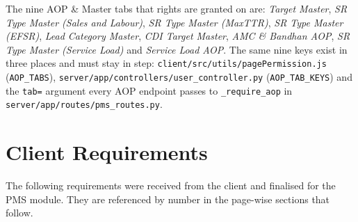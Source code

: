 \documentclass[11pt,a4paper]{article}
\newcommand{\file}[1]{\texttt{\small #1}}
\begin{document}
The nine AOP \& Master tabs that rights are granted on are: \textit{Target Master},
\textit{SR Type Master (Sales and Labour)}, \textit{SR Type Master (MaxTTR)},
\textit{SR Type Master (EFSR)}, \textit{Lead Category Master}, \textit{CDI Target
Master}, \textit{AMC \& Bandhan AOP}, \textit{SR Type Master (Service Load)} and
\textit{Service Load AOP}. The same nine keys exist in three places and must stay in
step: \file{client/src/utils/pagePermission.js} (\texttt{AOP\_TABS}),
\file{server/app/controllers/user\_controller.py} (\texttt{AOP\_TAB\_KEYS}) and the
\texttt{tab=} argument every AOP endpoint passes to \texttt{\_require\_aop} in
\file{server/app/routes/pms\_routes.py}.

\section{Client Requirements}

The following requirements were received from the client and finalised for the PMS
module. They are referenced by number in the page-wise sections that follow.
\end{document}
